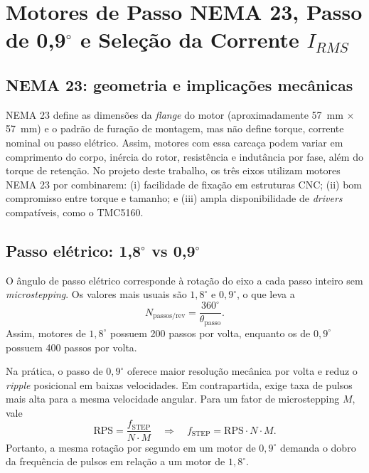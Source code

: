 \section{Motores de Passo NEMA 23, Passo de 0,9$^\circ$ e Sele\c{c}\~ao da Corrente $I_{RMS}$}
\label{sec:nema23_irms}

\subsection{NEMA 23: geometria e implica\c{c}\~oes mec\^anicas}

NEMA 23 define as dimens\~oes da \emph{flange} do motor
(aproximadamente \SI{57}{\milli\meter} $\times$
\SI{57}{\milli\meter}) e o padr\~ao de fura\c{c}\~ao de montagem, mas n\~ao
define torque, corrente nominal ou passo el\'etrico. Assim, motores com
essa carca\c{c}a podem variar em comprimento do corpo, in\'ercia do rotor,
resist\^encia e indut\^ancia por fase, al\'em do torque de reten\c{c}\~ao.
No projeto deste trabalho, os tr\^es eixos utilizam motores NEMA 23 por
combinarem: (i) facilidade de fixa\c{c}\~ao em estruturas CNC;
(ii) bom compromisso entre torque e tamanho; e
(iii) ampla disponibilidade de \emph{drivers} compat\'iveis, como o
TMC5160.

\subsection{Passo el\'etrico: 1,8$^\circ$ vs 0,9$^\circ$}

O \^angulo de passo el\'etrico corresponde \`a rota\c{c}\~ao do eixo a cada
passo inteiro sem \emph{microstepping}. Os valores mais usuais s\~ao
$1{,}8^\circ$ e $0{,}9^\circ$, o que leva a
\begin{equation}
    N_{\text{passos/rev}} = \frac{360^\circ}{\theta_{\text{passo}}}.
\end{equation}
Assim, motores de $1{,}8^\circ$ possuem 200 passos por volta, enquanto os
de $0{,}9^\circ$ possuem 400 passos por volta.

Na pr\'atica, o passo de $0{,}9^\circ$ oferece maior resolu\c{c}\~ao
mec\^anica por volta e reduz o \emph{ripple} posicional em baixas
velocidades. Em contrapartida, exige taxa de pulsos mais alta para a
mesma velocidade angular. Para um fator de microstepping $M$, vale
\begin{equation}
    \text{RPS} = \frac{f_{\text{STEP}}}{N \cdot M}
    \quad \Rightarrow \quad
    f_{\text{STEP}} = \text{RPS} \cdot N \cdot M.
\end{equation}
Portanto, a mesma rota\c{c}\~ao por segundo em um motor de $0{,}9^\circ$
demanda o dobro da frequ\^encia de pulsos em rela\c{c}\~ao a um motor de
$1{,}8^\circ$.

